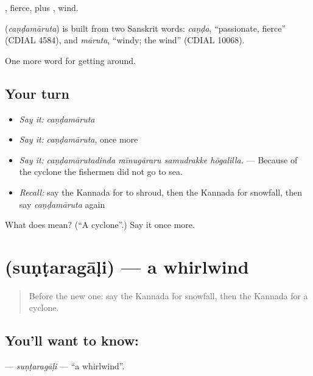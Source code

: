 , fierce, plus , wind.

\begin{cousinweb}
\textbf{} (\emph{caṇḍamāruta}) is built from two Sanskrit words: \emph{caṇḍa}, \textquotedblleft{}passionate, fierce\textquotedblright{} (CDIAL 4584), and \emph{māruta}, \textquotedblleft{}windy; the wind\textquotedblright{} (CDIAL 10068).
\end{cousinweb}

\begin{grammarlens}[title={What you've built}]
One more word for getting around.
\end{grammarlens}

\subsection*{Your turn}
\begin{itemize}
\raggedright
  \item \emph{Say it:} \emph{caṇḍamāruta}
  \item \emph{Say it:} \emph{caṇḍamāruta}, once more
  \item \emph{Say it:} \emph{caṇḍamārutadinda mīnugāraru samudrakke hōgalilla.} — Because of the cyclone the fishermen did not go to sea.
  \item \emph{Recall:} say the Kannada for to shroud, then the Kannada for snowfall, then say \emph{caṇḍamāruta} again
\end{itemize}

\begin{tcolorbox}[breakable,colback=teal!4,colframe=teal!35!black,title={Before you move on}]
What does  mean? (\textquotedblleft{}A cyclone\textquotedblright{}.) Say it once more.
\end{tcolorbox}
\section[\texorpdfstring{\kn{ಸುಂಟರಗಾಳಿ} (suṇṭaragāḷi)}{ಸುಂಟರಗಾಳಿ (suṇṭaragāḷi)}]{ (suṇṭaragāḷi) — a whirlwind}

\label{lesson:KA-C487-suntaragali}



\begin{quote}
Before the new one: say the Kannada for snowfall, then the Kannada for a cyclone.
\end{quote}

\subsection*{You'll want to know: }
\textbf{} — \emph{suṇṭaragāḷi} — \textquotedblleft{}a whirlwind\textquotedblright{}.

